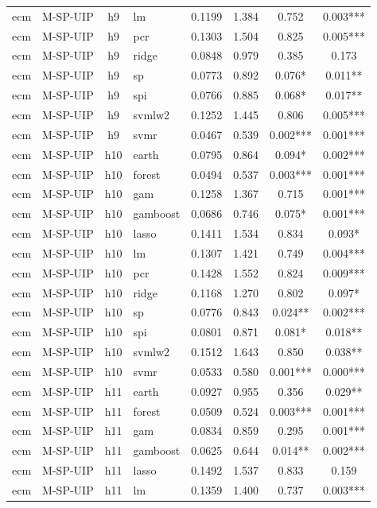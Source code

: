 \begin{ThreePartTable}
\begin{longtable}[t]{llclcccc}
ecm & M-SP-UIP & h9 & lm & 0.1199 & 1.384 & 0.752 & 0.003***\\
ecm & M-SP-UIP & h9 & pcr & 0.1303 & 1.504 & 0.825 & 0.005***\\
ecm & M-SP-UIP & h9 & ridge & 0.0848 & 0.979 & 0.385 & 0.173\\
ecm & M-SP-UIP & h9 & sp & 0.0773 & 0.892 & 0.076* & 0.011**\\
ecm & M-SP-UIP & h9 & spi & 0.0766 & 0.885 & 0.068* & 0.017**\\
ecm & M-SP-UIP & h9 & svmlw2 & 0.1252 & 1.445 & 0.806 & 0.005***\\
ecm & M-SP-UIP & h9 & svmr & 0.0467 & 0.539 & 0.002*** & 0.001***\\
\addlinespace
ecm & M-SP-UIP & h10 & earth & 0.0795 & 0.864 & 0.094* & 0.002***\\
ecm & M-SP-UIP & h10 & forest & 0.0494 & 0.537 & 0.003*** & 0.001***\\
ecm & M-SP-UIP & h10 & gam & 0.1258 & 1.367 & 0.715 & 0.001***\\
ecm & M-SP-UIP & h10 & gamboost & 0.0686 & 0.746 & 0.075* & 0.001***\\
ecm & M-SP-UIP & h10 & lasso & 0.1411 & 1.534 & 0.834 & 0.093*\\
ecm & M-SP-UIP & h10 & lm & 0.1307 & 1.421 & 0.749 & 0.004***\\
ecm & M-SP-UIP & h10 & pcr & 0.1428 & 1.552 & 0.824 & 0.009***\\
ecm & M-SP-UIP & h10 & ridge & 0.1168 & 1.270 & 0.802 & 0.097*\\
ecm & M-SP-UIP & h10 & sp & 0.0776 & 0.843 & 0.024** & 0.002***\\
ecm & M-SP-UIP & h10 & spi & 0.0801 & 0.871 & 0.081* & 0.018**\\
ecm & M-SP-UIP & h10 & svmlw2 & 0.1512 & 1.643 & 0.850 & 0.038**\\
ecm & M-SP-UIP & h10 & svmr & 0.0533 & 0.580 & 0.001*** & 0.000***\\
\addlinespace
ecm & M-SP-UIP & h11 & earth & 0.0927 & 0.955 & 0.356 & 0.029**\\
ecm & M-SP-UIP & h11 & forest & 0.0509 & 0.524 & 0.003*** & 0.001***\\
ecm & M-SP-UIP & h11 & gam & 0.0834 & 0.859 & 0.295 & 0.001***\\
ecm & M-SP-UIP & h11 & gamboost & 0.0625 & 0.644 & 0.014** & 0.002***\\
ecm & M-SP-UIP & h11 & lasso & 0.1492 & 1.537 & 0.833 & 0.159\\
ecm & M-SP-UIP & h11 & lm & 0.1359 & 1.400 & 0.737 & 0.003***\\

\end{longtable}
\end{ThreePartTable}
